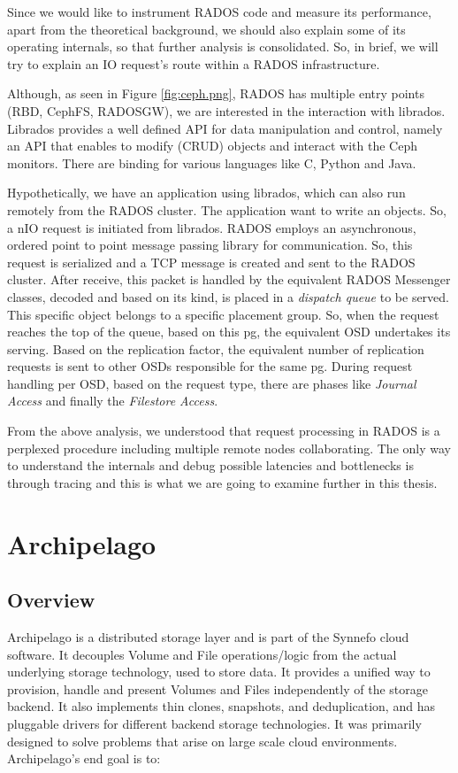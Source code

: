 Since we would like to instrument RADOS code and measure its performance, apart
from the theoretical background, we should also explain some of its operating
internals, so that further analysis is consolidated. So, in brief, we will try
to explain an IO request's route within a RADOS infrastructure.

Although, as seen in Figure \ref{fig:ceph.png}, RADOS has multiple entry points
(RBD, CephFS, RADOSGW), we are interested in the interaction with librados.
Librados provides a well defined API for data manipulation and control, namely
an API that enables to modify (CRUD) objects and interact with the Ceph
monitors. There are binding for various languages like C, Python and Java. 

Hypothetically, we have an application using librados, which can also run
remotely from the RADOS cluster. The application want to write an objects. So, a
nIO request is initiated from librados. RADOS employs an asynchronous, ordered
point to point message passing library for communication. So, this request is
serialized and a TCP message is created and sent to the RADOS cluster. After
receive, this packet is handled by the equivalent RADOS Messenger classes,
decoded and based on its kind, is placed in a \textit{dispatch queue} to be
served. This specific object belongs to a specific placement group. So, when the
request reaches the top of the queue, based on this pg, the equivalent OSD
undertakes its serving. Based on the replication factor, the equivalent number
of replication requests is sent to other OSDs responsible for the same pg.
During request handling per OSD, based on the request type, there are phases
like \textit{Journal Access} and finally the \textit{Filestore Access}.

From the above analysis, we understood that request processing in RADOS is a
perplexed procedure including multiple remote nodes collaborating. The only way
to understand the internals and debug possible latencies and bottlenecks is
through tracing and this is what we are going to examine further in this thesis.

\section{Archipelago}\label{sec:archip-bkg}

\subsection{Overview}
Archipelago is a distributed storage layer and is part of the Synnefo cloud
software. It decouples Volume and File operations/logic from the actual
underlying storage technology, used to store data. It provides a unified way to
provision, handle and present Volumes and Files independently of the storage
backend. It also implements thin clones, snapshots, and deduplication, and has
pluggable drivers for different backend storage technologies. It was primarily
designed to solve problems that arise on large scale cloud environments.
Archipelago's end goal is to:

